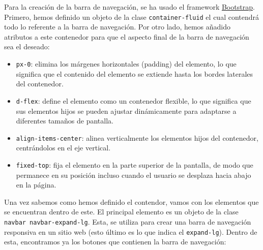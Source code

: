 \documentclass{article}
\begin{document}
\noindent Para la creación de la barra de navegación, se ha usado el framework \href{https://getbootstrap.com/}{Bootstrap}. Primero, hemos definido un objeto de la clase \texttt{container-fluid} el cual contendrá todo lo referente a la barra de navegación. Por otro lado, hemos añadido atributos a este contenedor para que el aspecto final de la barra de navegación sea el deseado:
\begin{itemize}
    \item \texttt{px-0}: elimina los márgenes horizontales (padding) del elemento, lo que significa que el contenido del elemento se extiende hasta los bordes laterales del contenedor.
    \item \texttt{d-flex}: define el elemento como un contenedor flexible, lo que significa que sus elementos hijos se pueden ajustar dinámicamente para adaptarse a diferentes tamaños de pantalla.
    \item \texttt{align-items-center}: alinea verticalmente los elementos hijos del contenedor, centrándolos en el eje vertical.
    \item \texttt{fixed-top}: fija el elemento en la parte superior de la pantalla, de modo que permanece en su posición incluso cuando el usuario se desplaza hacia abajo en la página.
\end{itemize}
Una vez sabemos como hemos definido el contendor, vamos con los elementos que se encuentran dentro de este. El principal elemento es un objeto de la clase \texttt{navbar navbar-expand-lg}. Esta, se utiliza para crear una barra de navegación responsiva en un sitio web (esto último es lo que indica el \texttt{expand-lg}). Dentro de esta, encontramos ya los botones que contienen la barra de navegación:
\end{document}
